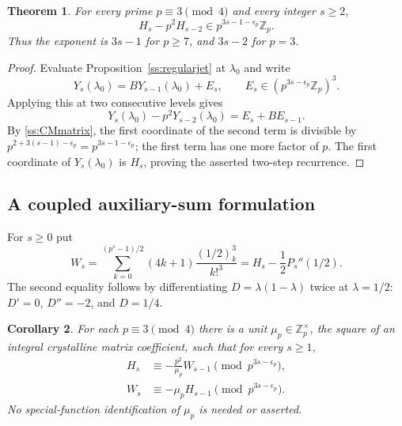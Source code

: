\documentclass[11pt,a4paper]{article}
\newtheorem{theorem}{Theorem}[section]
\newtheorem{corollary}[theorem]{Corollary}
\begin{document}
\begin{theorem}\label{ss:main}
For every prime $p\equiv3\pmod4$ and every integer $s\geq2$,
\[
 H_s-p^2H_{s-2}\in p^{3s-1-\epsilon_p}\mathbb Z_p.
\]
Thus the exponent is $3s-1$ for $p\geq7$, and $3s-2$ for $p=3$.
\end{theorem}

\begin{proof}
Evaluate Proposition~\ref{ss:regularjet} at $\lambda_0$ and write
\[
 Y_s(\lambda_0)=B Y_{s-1}(\lambda_0)+E_s,
 \qquad E_s\in(p^{3s-\epsilon_p}\mathbb Z_p)^3.
\]
Applying this at two consecutive levels gives
\[
 Y_s(\lambda_0)-p^2Y_{s-2}(\lambda_0)=E_s+BE_{s-1}.
\]
By \eqref{ss:CMmatrix}, the first coordinate of the second term is
divisible by $p^{2+3(s-1)-\epsilon_p}=p^{3s-1-\epsilon_p}$; the first
term has one more factor of $p$.  The first coordinate of $Y_s(\lambda_0)$
is $H_s$, proving the asserted two-step recurrence.
\end{proof}

\subsection{A coupled auxiliary-sum formulation}

For $s\geq0$ put
\[
 W_s=\sum_{k=0}^{(p^s-1)/2}(4k+1)\frac{(1/2)_k^3}{k!^3}
     =H_s-\frac12P_s''(1/2).
\]
The second equality follows by differentiating $D=\lambda(1-\lambda)$
twice at $\lambda=1/2$: $D'=0$, $D''=-2$, and $D=1/4$.

\begin{corollary}\label{ss:coupled}
For each $p\equiv3\pmod4$ there is a unit
$\mu_p\in\mathbb Z_p^\times$, the square of an integral crystalline
matrix coefficient, such that for every $s\geq1$,
\[
 \begin{split}
 H_s&\equiv-\frac{p^2}{\mu_p}W_{s-1}
                    \pmod{p^{3s-\epsilon_p}},\\
 W_s&\equiv-\mu_p H_{s-1}
                    \pmod{p^{3s-\epsilon_p}}.
 \end{split}
\]
No special-function identification of $\mu_p$ is needed or asserted.
\end{corollary}
\end{document}
